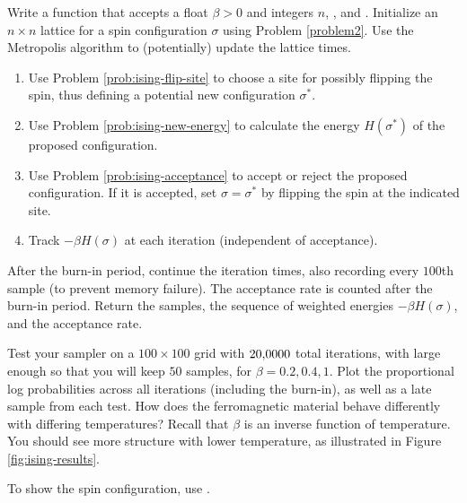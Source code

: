\begin{problem}
Write a function that accepts a float $\beta>0$ and integers $n$, , and .
Initialize an $n\times n$ lattice for a spin configuration $\sigma$ using Problem \ref{problem2}.
Use the Metropolis algorithm to (potentially) update the lattice  times.
\begin{enumerate}
    \item Use Problem \ref{prob:ising-flip-site} to choose a site for possibly flipping the spin, thus defining a potential new configuration $\sigma^*$.
    \item Use Problem \ref{prob:ising-new-energy} to calculate the energy $H(\sigma^*)$ of the proposed configuration.
    \item Use Problem \ref{prob:ising-acceptance} to accept or reject the proposed configuration.
    If it is accepted, set $\sigma = \sigma^*$ by flipping the spin at the indicated site.
    \item Track $-\beta H(\sigma)$ at each iteration (independent of acceptance).
\end{enumerate}
After the burn-in period, continue the iteration  times, also recording every $100$th sample (to prevent memory failure).
The acceptance rate is counted after the burn-in period.
Return the samples, the sequence of weighted energies $-\beta H(\sigma)$, and the acceptance rate.

Test your sampler on a $100 \times 100$ grid with $20{\small,}0000$ total iterations, with  large enough so that you will keep $50$ samples, for $\beta = 0.2, 0.4, 1$.
Plot the proportional log probabilities across all iterations (including the burn-in), as well as a late sample from each test.
How does the ferromagnetic material behave differently with differing temperatures?
Recall that $\beta$ is an inverse function of temperature.
You should see more structure with lower temperature, as illustrated in Figure \ref{fig:ising-results}.

To show the spin configuration, use .
\end{problem}

